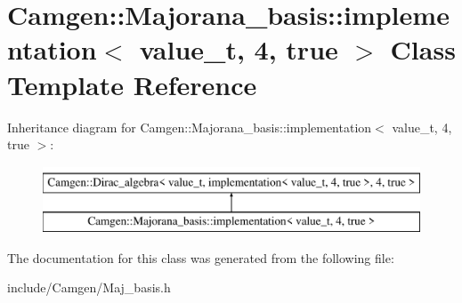 \hypertarget{a00302}{\section{Camgen\-:\-:Majorana\-\_\-basis\-:\-:implementation$<$ value\-\_\-t, 4, true $>$ Class Template Reference}
\label{a00302}
}
Inheritance diagram for Camgen\-:\-:Majorana\-\_\-basis\-:\-:implementation$<$ value\-\_\-t, 4, true $>$\-:\begin{figure}[H]
\begin{center}
\leavevmode
\includegraphics[height=2.000000cm]{a00302}
\end{center}
\end{figure}


The documentation for this class was generated from the following file\-:\begin{DoxyCompactItemize}
\item 
include/\-Camgen/Maj\-\_\-basis.\-h\end{DoxyCompactItemize}
